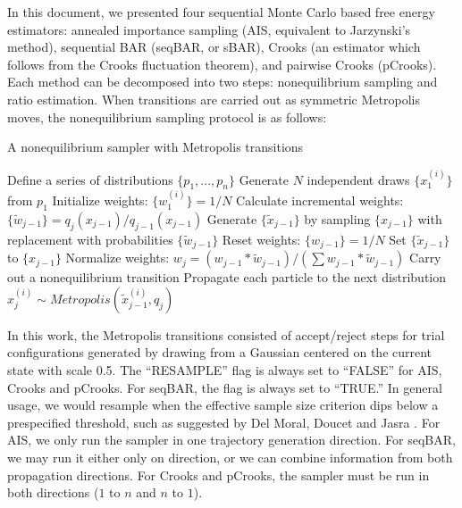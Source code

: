 In this document, we presented four sequential Monte Carlo based free energy estimators: annealed importance sampling (AIS, equivalent to Jarzynski's method), sequential BAR (seqBAR, or sBAR), Crooks (an estimator which follows from the Crooks fluctuation theorem), and pairwise Crooks (pCrooks).
Each method can be decomposed into two steps: nonequilibrium sampling and ratio estimation.
When transitions are carried out as symmetric Metropolis moves, the nonequilibrium sampling protocol is as follows:

\begin{algorithm}
\caption{A nonequilibrium sampler with Metropolis transitions}
\begin{algorithmic}[1]
    \STATE Define a series of distributions $\{p_1, ..., p_n\}$
    \STATE Generate $N$ independent draws $\{x_1^{(i)}\}$ from $p_1$
    \STATE Initialize weights: $\{w_1^{(i)}\}=1/N$
        \STATE Calculate incremental weights: $\{\tilde{w}_{j-1}\} = q_j(x_{j-1})/q_{j-1}(x_{j-1})$
            \STATE Generate $\{ \tilde{x}_{j-1} \}$ by sampling $\{ x_{j-1} \}$ with replacement with probabilities $\{\tilde{w}_{j-1}\}$
            \STATE Reset weights: $\{ w_{j-1} \} = 1/N$
        \ELSE
            \STATE Set $\{ \tilde{x}_{j-1} \}$ to $\{ x_{j-1} \}$
        \ENDIF
        \STATE Normalize weights: $w_j = (w_{j-1}*\tilde{w}_{j-1})/ (\sum w_{j-1}*\tilde{w}_{j-1})$
        \STATE Carry out a nonequilibrium transition
            \STATE Propagate each particle to the next distribution
            \STATE $x_j^{(i)} \sim Metropolis(\tilde{x}_{j-1}^{(i)}, q_j)$
        \ENDFOR
    \ENDFOR
\end{algorithmic}
\end{algorithm}

In this work, the Metropolis transitions consisted of accept/reject steps for trial configurations generated by drawing from a Gaussian centered on the current state with scale 0.5.
The ``RESAMPLE'' flag is always set to ``FALSE'' for AIS, Crooks and pCrooks. 
For seqBAR, the flag is always set to ``TRUE.'' 
In general usage, we would resample when the effective sample size criterion dips below a prespecified threshold, such as suggested by Del Moral, Doucet and Jasra \cite{del2006sequential}.
For AIS, we only run the sampler in one trajectory generation direction. 
For seqBAR, we may run it either only on direction, or we can combine information from both propagation directions.
For Crooks and pCrooks, the sampler must be run in both directions ($1$ to $n$ and $n$ to $1$).

